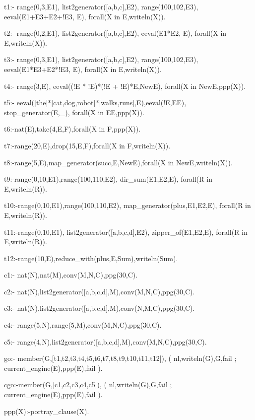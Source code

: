 \documentclass{new_tlp}
\begin{document}
\begin{code}
t1:-
  range(0,3,E1),
  list2generator([a,b,c],E2),
  range(100,102,E3),
  eeval(E1+E3+E2+!E3, E),
  forall(X in E,writeln(X)).
    
t2:-
  range(0,2,E1),
  list2generator([a,b,c],E2),
  eeval(E1*E2, E),
  forall(X in E,writeln(X)).

  
t3:-
  range(0,3,E1),
  list2generator([a,b,c],E2),
  range(100,102,E3),
  eeval(E1*E3+E2*!E3, E),
  forall(X in E,writeln(X)).

t4:- 
  range(3,E),
  eeval((!E * !E)*(!E + !E)*E,NewE),
  forall(X in NewE,ppp(X)). 
  
t5:- 
 eeval([the]*[cat,dog,robot]*[walks,runs],E),eeval(!E,EE),
  stop_generator(E,_),
  forall(X in EE,ppp(X)).

t6:-nat(E),take(4,E,F),forall(X in F,ppp(X)).

t7:-range(20,E),drop(15,E,F),forall(X in F,writeln(X)).

t8:-range(5,E),map_generator(succ,E,NewE),forall(X in NewE,writeln(X)).


t9:-range(0,10,E1),range(100,110,E2),
    dir_sum(E1,E2,E),
    forall(R in E,writeln(R)).
    
t10:-range(0,10,E1),range(100,110,E2),
    map_generator(plus,E1,E2,E),
    forall(R in E,writeln(R)).

t11:-range(0,10,E1),
    list2generator([a,b,c,d],E2),
    zipper_of(E1,E2,E),
    forall(R in E,writeln(R)).


t12:-range(10,E),reduce_with(plus,E,Sum),writeln(Sum).

c1:-
  nat(N),nat(M),conv(M,N,C),ppg(30,C).

c2:-
  nat(N),list2generator([a,b,c,d],M),conv(M,N,C),ppg(30,C).

c3:-
  nat(N),list2generator([a,b,c,d],M),conv(N,M,C),ppg(30,C).

c4:-
  range(5,N),range(5,M),conv(M,N,C),ppg(30,C).

c5:-
  range(4,N),list2generator([a,b,c,d],M),conv(M,N,C),ppg(30,C).
  
      
go:-
   member(G,[t1,t2,t3,t4,t5,t6,t7,t8,t9,t10,t11,t12]),
   ( nl,writeln(G),G,fail
   ; current_engine(E),ppp(E),fail 
   ).

cgo:-member(G,[c1,c2,c3,c4,c5]),
   ( nl,writeln(G),G,fail
   ; current_engine(E),ppp(E),fail 
   ).
      
ppp(X):-portray_clause(X).
\end{code}
\end{document}
